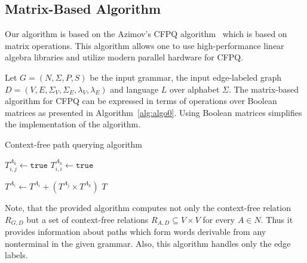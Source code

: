 \subsection{Matrix-Based Algorithm}
Our algorithm is based on the Azimov's CFPQ algorithm~\cite{Azimov:2018:CPQ:3210259.3210264} which is based on matrix operations.
This algorithm allows one to use high-performance linear algebra libraries and utilize modern parallel hardware for CFPQ.

Let $G = (N, \Sigma, P, S)$ be the input grammar, the input edge-labeled graph $D = (V, E, \Sigma_V, \Sigma_E, \lambda_V, \lambda_E)$ and language $L$ over alphabet $\Sigma$.
The matrix-based algorithm for CFPQ can be expressed in terms of operations over Boolean matrices as presented in Algorithm~\ref{alg:algo0}.
Using Boolean matrices simplifies the implementation of the algorithm.

{
\begin{algorithm}
\begin{algorithmic}[1]
\caption{Context-free path querying algorithm}
\label{alg:algo0}
          {$T^{A_k}_{i,j} \gets \texttt{true}$}
    \EndFor
            {$T^{A_k}_{i,i} \gets \texttt{true}$}
        \EndFor
    \EndFor

          { $T^{A_i} \gets T^{A_i} + (T^{A_j} \times T^{A_k})$ }
        \EndFor
    \EndWhile
\State \Return $T$
\EndFunction
\end{algorithmic}
\end{algorithm}
}

Note, that the provided algorithm computes not only the context-free relation $R_{G,D}$ but a set of context-free relations $R_{A,D} \subseteq V \times V$ for every $A \in N$.
Thus it provides information about paths which form words derivable from any nonterminal in the given grammar.
Also, this algorithm handles only the edge labels.


